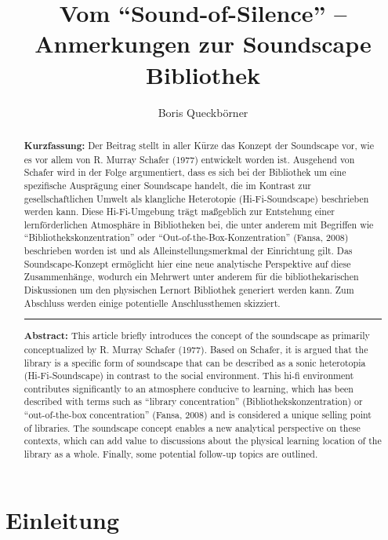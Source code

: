 \documentclass[a4paper,
fontsize=11pt,
oneside,
numbers=noperiodatend,
parskip=half-,
bibliography=totoc,
final
]{scrartcl}
\title{\LARGE{Vom \enquote{Sound-of-Silence} -- Anmerkungen zur Soundscape Bibliothek}}%
\author{Boris Queckbörner} %
\date{}
\begin{document}
\maketitle
\thispagestyle{fancyplain} 

\begin{abstract}
\noindent
\textbf{Kurzfassung:} Der Beitrag stellt in aller Kürze das Konzept der
Soundscape vor, wie es vor allem von R. Murray Schafer (1977) entwickelt
worden ist. Ausgehend von Schafer wird in der Folge argumentiert, dass
es sich bei der Bibliothek um eine spezifische Ausprägung einer
Soundscape handelt, die im Kontrast zur gesellschaftlichen Umwelt als
klangliche Heterotopie (Hi-Fi-Soundscape) beschrieben werden kann. Diese
Hi-Fi-Umgebung trägt maßgeblich zur Entstehung einer lernförderlichen
Atmosphäre in Bibliotheken bei, die unter anderem mit Begriffen wie
\enquote{Bibliothekskonzentration} oder \enquote{Out-of-the-Box-Konzentration}
(Fansa, 2008) beschrieben worden ist und als Alleinstellungsmerkmal der
Einrichtung gilt. Das Soundscape-Konzept ermöglicht hier eine neue
analytische Perspektive auf diese Zusammenhänge, wodurch ein Mehrwert
unter anderem für die bibliothekarischen Diskussionen um den physischen
Lernort Bibliothek generiert werden kann. Zum Abschluss werden einige
potentielle Anschlussthemen skizziert.

\begin{center}\rule{0.5\linewidth}{0.5pt}\end{center}

\noindent
\textbf{Abstract:} This article briefly introduces the concept of the
soundscape as primarily conceptualized by R. Murray Schafer (1977).
Based on Schafer, it is argued that the library is a specific form of
soundscape that can be described as a sonic heterotopia
(Hi-Fi-Soundscape) in contrast to the social environment. This hi-fi
environment contributes significantly to an atmosphere conducive to
learning, which has been described with terms such as \enquote{library
concentration} (Bibliothekskonzentration) or \enquote{out-of-the-box
concentration} (Fansa, 2008) and is considered a unique selling point
of libraries. The soundscape concept enables a new analytical
perspective on these contexts, which can add value to discussions about
the physical learning location of the library as a whole. Finally, some
potential follow-up topics are outlined.
\end{abstract}



\hypertarget{einleitung}{%
\section{Einleitung}\label{einleitung}}
\end{document}
